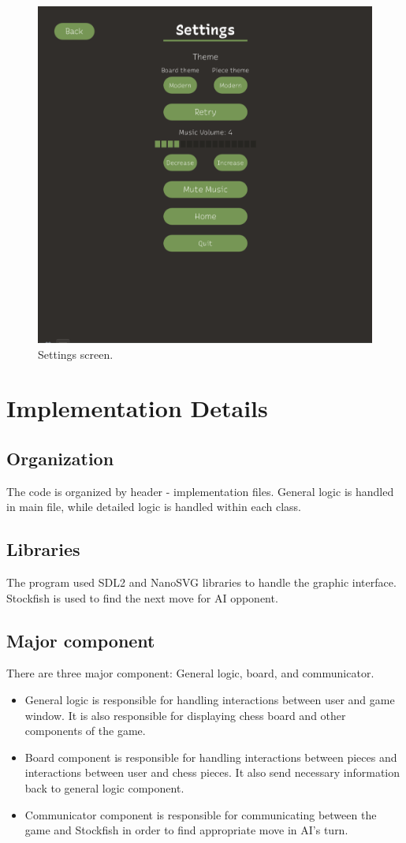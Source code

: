 \documentclass[a4paper, 10pt, titlepage]{report}
\begin{document}
  \begin{figure}%
    \includegraphics[width=\linewidth]{settings_screen.png}
    \caption{Settings screen.}
    \label{fig:fifth}
  \end{figure}%
\chapter{Implementation Details}
\section{Organization}
The code is organized by header - implementation files. General logic is handled in main file, while detailed logic is handled within each class.
\section{Libraries}
The program used SDL2 and NanoSVG libraries to handle the graphic interface. Stockfish is used to find the next move for AI opponent.
\section{Major component}
There are three major component: General logic, board, and communicator.
\begin{itemize}
  \item General logic is responsible for handling interactions between user and game window. It is also responsible for displaying chess board and other components of the game.
  \item Board component is responsible for handling interactions between pieces and interactions between user and chess pieces. It also send necessary information back to general logic component.
  \item Communicator component is responsible for communicating between the game and Stockfish in order to find appropriate move in AI's turn.
\end{itemize}
\end{document}

